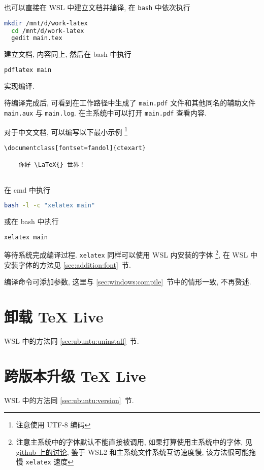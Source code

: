 也可以直接在 WSL 中建立文档并编译,
在 \texttt{bash} 中依次执行
\begin{lstlisting}[language=bash]
  mkdir /mnt/d/work-latex
  cd /mnt/d/work-latex
  gedit main.tex
\end{lstlisting}
建立文档,
内容同上,
然后在 \textsf{bash} 中执行
\begin{lstlisting}[language=bash]
  pdflatex main
\end{lstlisting}
实现编译.

待编译完成后, 可看到在工作路径中生成了 \texttt{main.pdf}
文件和其他同名的辅助文件 \texttt{main.aux} 与 \texttt{main.log}.
在主系统中可以打开 \texttt{main.pdf} 查看内容.

对于中文文档,
可以编写以下最小示例%
\footnote{注意使用 UTF-8 编码}%
\begin{lstlisting}[language={[LaTeX]TeX}]
  \documentclass[fontset=fandol]{ctexart}
  
    你好 \LaTeX{} 世界！
  
\end{lstlisting}
在 \textsf{cmd} 中执行
\begin{lstlisting}[language=bash]
  bash -l -c "xelatex main"
\end{lstlisting}
或在 \textsf{bash} 中执行
\begin{lstlisting}[language=bash]
  xelatex main
\end{lstlisting}
等待系统完成编译过程. 
\texttt{xelatex} 同样可以使用 WSL 内安装的字体%
\footnote{注意主系统中的字体默认不能直接被调用,
如果打算使用主系统中的字体,
见
\href{https://github.com/OsbertWang/install-latex-guide-zh-cn/issues/14}{github 上的讨论},
鉴于 WSL2 和主系统文件系统互访速度慢,
该方法很可能拖慢 \texttt{xelatex} 速度},
在 WSL 中安装字体的方法见 \ref{sec:addition:font}~节.

编译命令可添加参数, 这里与 \ref{sec:windows:compile}~节中的情形一致, 不再赘述.

\section{卸载 \TeX{} Live}

WSL 中的方法同 \ref{sec:ubuntu:uninstall}~节.

\section{跨版本升级 \TeX{} Live}

WSL 中的方法同 \ref{sec:ubuntu:version}~节.

